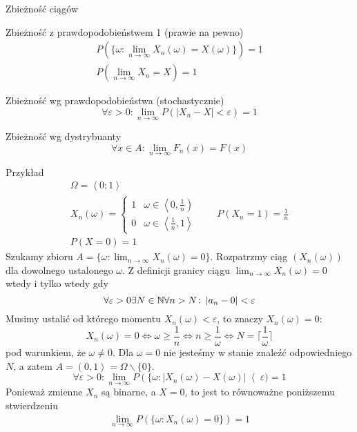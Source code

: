 \documentclass{mp}
\subtitle{Ciągi zmiennych losowych}
\begin{document}
\frame{\titlepage}
\begin{frame}{Zbieżność ciągów}
{
\begin{block}{Zbieżność z prawdopodobieństwem 1 (prawie na pewno)}
\begin{gather*}
P(\{\omega\colon \lim_{n\to\infty}X_n(\omega)=X(\omega)\})=1 \\
P(\lim_{n\to\infty} X_n=X)=1
\end{gather*}
\end{block}
}
{
\begin{block}{Zbieżność wg prawdopodobieństwa (stochastycznie)}
\[\forall\varepsilon>0\colon \lim_{n\to\infty}P(\left|X_n-X\right|<\varepsilon)=1\]
\end{block}
}
{
\begin{block}{Zbieżność wg dystrybuanty}
\[\forall x\in A\colon \lim_{n\to\infty} F_n(x) =F(x) \]
\end{block}
}
{
\begin{block}{Przykład}
\begin{gather*}
\Omega=\left<0;1\right> \\
X_n(\omega)=\begin{cases} 1 & \omega\in\left<0,\frac{1}{n}\right)\\0 & \omega\in\left<\frac{1}{n},1\right> \end{cases} \qquad P(X_n=1)=\frac{1}{n}\\
P(X=0)=1
\end{gather*}
{
	Szukamy zbioru $A=\{\omega\colon \lim_{n\to\infty} X_n(\omega)=0\}$.
	Rozpatrzmy ciąg $(X_n(\omega))$ dla dowolnego ustalonego $\omega$.
	Z definicji granicy ciągu $\lim_{n\to\infty} X_n(\omega)=0$ wtedy i tylko wtedy gdy \[\forall \varepsilon>0\exists N\in\mathbb{N} \forall n>N\colon \left|a_n-0\right|<\varepsilon\]
	Musimy ustalić od którego momentu $X_n(\omega)<\varepsilon$, to znaczy $X_n(\omega)=0$:
	\[ X_n(\omega)=0 \iff \omega\geq\frac{1}{n} \iff n\geq\frac{1}{\omega} \iff N=\lceil\frac{1}{\omega}\rceil \]
	pod warunkiem, że $\omega\neq 0$.
	Dla $\omega=0$ nie jesteśmy w stanie znaleźć odpowiedniego $N$, a zatem $A=\left(0,1\right>=\Omega\backslash\{0\}$.
}
{
	\[ \forall \varepsilon>0\colon \lim_{n\to\infty} P\left(\{\omega\colon \left|X_n(\omega)-X(\omega)\right|\right<\varepsilon)=1 \]
	Ponieważ zmienne $X_n$ są binarne, a $X=0$, to jest to równoważne poniższemu stwierdzeniu
	\begin{gather*}
	 \lim_{n\to\infty} P\left(\{\omega\colon X_n(\omega)=0\}\right)=1 \\

\end{gather*}}
\end{block}}
\end{frame}
\end{document}

